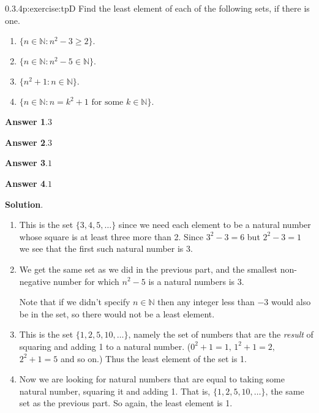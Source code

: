 \documentclass[twoside,11pt,]{book}
\newcommand{\blocktitlefont}{\relax}
\numberwithin{equation}{chapter}
\newcommand{\N}{\mathbb N}
\newcommand{\st}{:}
\begin{document}
\begin{divisionsolution}{0.3.4}{}{p:exercise:tpD}%
Find the least element of each of the following sets, if there is one.%
\begin{enumerate}[label=(\alph*)]
\item{}\(\{n \in \N \st n^2 - 3 \ge 2\}\text{.}\)%
\item{}\(\{n \in \N \st n^2 - 5 \in \N\}\text{.}\)%
\item{}\(\{n^2+1 \st n \in \N\}\text{.}\)%
\item{}\(\{n \in \N \st n = k^2 + 1 \text{ for some } k \in \N\}\text{.}\)%
\end{enumerate}
%
\par\smallskip%
\noindent\textbf{\blocktitlefont Answer 1}.\quad{}\(3\)%
\par\smallskip%
\noindent\textbf{\blocktitlefont Answer 2}.\quad{}\(3\)%
\par\smallskip%
\noindent\textbf{\blocktitlefont Answer 3}.\quad{}\(1\)%
\par\smallskip%
\noindent\textbf{\blocktitlefont Answer 4}.\quad{}\(1\)%
\par\smallskip%
\noindent\textbf{\blocktitlefont Solution}.\quad{}%
\begin{enumerate}[label=(\alph*)]
\item{}This is the set \(\{3, 4, 5, \ldots \}\) since we need each element to be a natural number whose square is at least three more than 2. Since \(3^2 - 3 = 6\) but \(2^2 - 3 = 1\) we see that the first such natural number is 3.%
\item{}We get the same set as we did in the previous part, and the smallest non-negative number for which \(n^2 - 5\) is a natural numbers is 3.%
\par
Note that if we didn't specify \(n \in \N\) then any integer less than \(-3\) would also be in the set, so there would not be a least element.%
\item{}This is the set \(\{1, 2, 5, 10, \ldots\}\text{,}\) namely the set of numbers that are the \emph{result} of squaring and adding 1 to a natural number. (\(0^2 + 1 = 1\text{,}\) \(1^2 + 1 = 2\text{,}\) \(2^2 + 1 = 5\) and so on.) Thus the least element of the set is 1.%
\item{}Now we are looking for natural numbers that are equal to taking some natural number, squaring it and adding 1. That is, \(\{1, 2, 5, 10, \ldots\}\text{,}\) the same set as the previous part. So again, the least element is 1.%
\end{enumerate}
%
\end{divisionsolution}%
\end{document}
